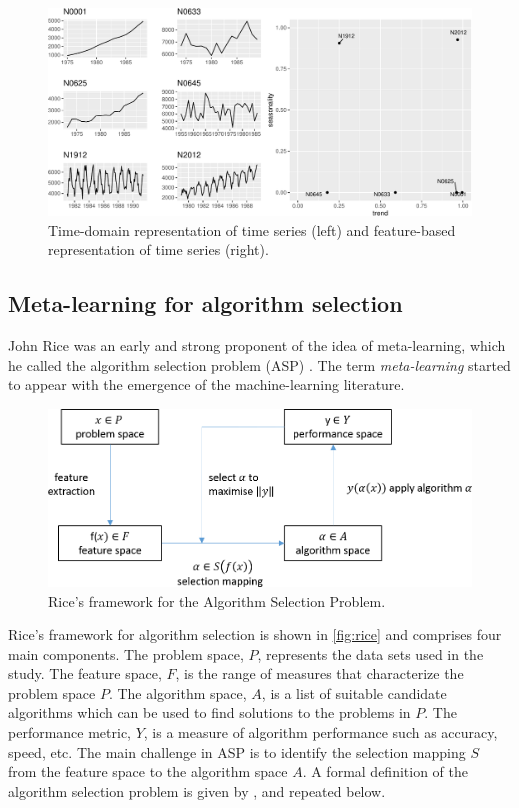 \documentclass[11pt,a4paper,]{article}
\begin{document}
\begin{figure}

{\centering \includegraphics[width=\textwidth]{figure/fig1-1} 

}

\caption{Time-domain representation of time series (left) and feature-based representation of time series (right).}\label{fig:fig1}
\end{figure}

\hypertarget{meta-learning-for-algorithm-selection}{%
\subsection{Meta-learning for algorithm selection}\label{meta-learning-for-algorithm-selection}}

John Rice was an early and strong proponent of the idea of meta-learning, which he called the algorithm selection problem (ASP) \autocite{rice1976}. The term \emph{meta-learning} started to appear with the emergence of the machine-learning literature.

\begin{figure}

{\centering \includegraphics[width=0.7\linewidth]{images/RiceFramework} 

}

\caption{Rice's framework for the Algorithm Selection Problem.}\label{fig:rice}
\end{figure}

Rice's framework for algorithm selection is shown in \autoref{fig:rice} and comprises four main components. The problem space, \(P\), represents the data sets used in the study. The feature space, \(F\), is the range of measures that characterize the problem space \(P\). The algorithm space, \(A\), is a list of suitable candidate algorithms which can be used to find solutions to the problems in \(P\). The performance metric, \(Y\), is a measure of algorithm performance such as accuracy, speed, etc. The main challenge in ASP is to identify the selection mapping \(S\) from the feature space to the algorithm space \(A\). A formal definition of the algorithm selection problem is given by \textcite{smith2009cross}, and repeated below.
\end{document}
